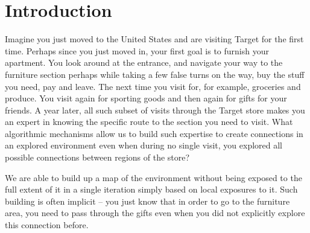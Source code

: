\section{Introduction}

Imagine you just moved to the United States and are visiting Target for the first time. Perhaps since you just moved in, your first goal is to furnish your apartment. You look around at the entrance, and navigate your way to the furniture section perhaps while taking a few false turns on the way, buy the stuff you need, pay and leave. The next time you visit for, for example, groceries and produce. You visit again for sporting goods and then again for gifts for your friends. A year later, all such subset of visits through the Target store makes you an expert in knowing the specific route to the section you need to visit. What algorithmic mechanisms allow us to build such expertise to create connections in an explored environment even when during no single visit, you explored all possible connections between regions of the store?

We are able to build up a map of the environment without being exposed to the full extent of it in a single iteration simply based on local exposures to it. Such building is often implicit -- you just know that in order to go to the furniture area, you need to pass through the gifts even when you did not explicitly explore this connection before. 

